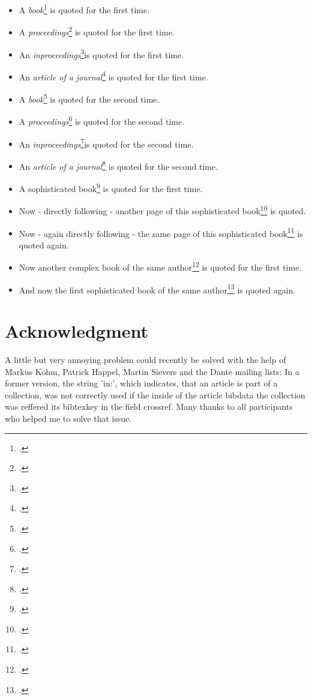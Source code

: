 \documentclass[
  DIV=calc,
  BCOR=5mm,
  11pt,
  headings=small,
  oneside,
  abstract=true,
  toc=bib,
  ngerman,english]{scrartcl}
\begin{document}
\begin{itemize}
  \item A \textit{book}\footcite[cf.][123]{AllHen2008a} is quoted for the first time.
  \item A \textit{proceedings}\footcite[cf.][234]{Brachman1985a} is quoted for the first time.
  \item An \textit{inproceedings}\footcite[cf.][345]{Hays1985a}is quoted for the first time.
  \item An \textit{article of a journal}\footcite[cf.][456]{McCarthy1980a} is quoted for
  the first time.
  \item A \textit{book}\footcite[cf.][123]{AllHen2008a} is quoted for the second time.
  \item A \textit{proceedings}\footcite[cf.][234]{Brachman1985a} is quoted for the second
  time.
  \item An \textit{inproceedings}\footcite[cf.][345]{Hays1985a}is quoted for the
  second time.
  \item An \textit{article of a journal}\footcite[cf.][456]{McCarthy1980a} is quoted for the second time.
  \item A sophisticated book\footcite[cf.][567]{KantKdV1974} is quoted for the first time.
  \item Now - directly following - another page of this sophisticated
  book\footcite[cf.][678]{KantKdV1974} is quoted.
  \item Now - again directly following - the same page of this sophisticated
  book\footcite[cf.][678]{KantKdV1974} is quoted again.
  \item Now another complex book of the same
  author\footcite[cf.][789]{KantKdU1974} is quoted for the first time.
  \item And now the first sophisticated book of the same
  author\footcite[cf.][789]{KantKdV1974} is quoted again.
\end{itemize}
\small

\section{Acknowledgment}

A little but very annoying problem could recently be solved with the help of
Markus Kohm, Patrick Happel, Martin Sievers and the Dante mailing lists: In a
former version, the string 'in:', which indicates, that an article is part
of a collection, was not correctly used if the inside of the article
bibdata the collection was reffered its bibtexkey in the field crossref. Many
thanks to all participants who helped me to solve that issue.




\printnomenclature


\end{document}
